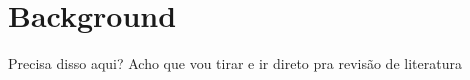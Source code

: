 \chapter{Background}\label{chap:background}

Precisa disso aqui?
Acho que vou tirar e ir direto pra revisão de literatura